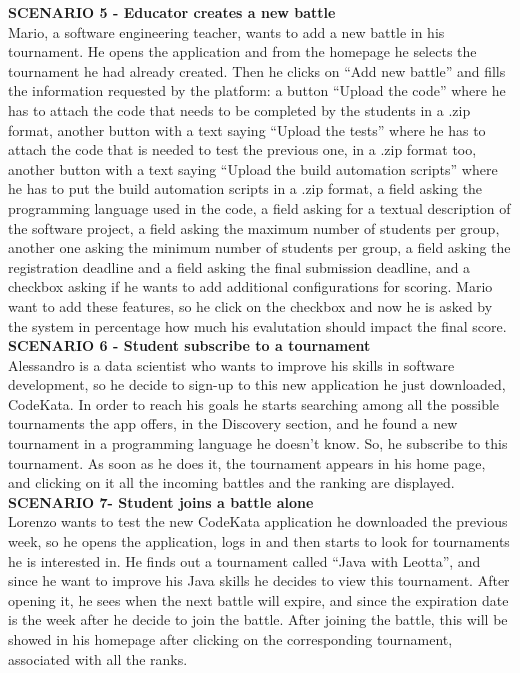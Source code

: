     \textbf{SCENARIO 5 - Educator creates a new battle}\\
    Mario, a software engineering teacher, wants to add a new battle in his tournament. He opens the application and from the homepage he selects the tournament he had already created. Then he clicks on ``Add new battle'' and fills the information requested by the platform:
    a button ``Upload the code'' where he has to attach the code that needs to be completed by the students in a .zip format, another button with a text saying  ``Upload the tests'' where he has to attach the code that is needed to test the previous one, in a .zip format too, another button with a text saying  ``Upload the build automation scripts'' where he has to put the build automation scripts in a .zip format, a field asking the programming language used in the code, a field asking for a textual description of the software project, a field asking the maximum number of students per group, another one asking the minimum number of students per group, a field asking the registration deadline and a field asking the final submission deadline, and a checkbox asking if he wants to add additional configurations for scoring.
    Mario want to add these features, so he click on the checkbox and now he is asked by the system in percentage how much his evalutation should impact the final score.\\


    \textbf{SCENARIO 6 - Student subscribe to a tournament}\\
    Alessandro is a data scientist who wants to improve his skills in software development, so he decide to sign-up to this new application he just downloaded, CodeKata. 
    In order to reach his goals he starts searching among all the possible tournaments the app offers, in the Discovery section, and he found a new tournament in a programming language he doesn't know. So, he subscribe to this tournament. 
    As soon as he does it, the tournament appears in his home page, and clicking on it all the incoming battles and the ranking are displayed.\\


    \textbf{SCENARIO 7- Student joins a battle alone}\\
    Lorenzo wants to test the new CodeKata application he downloaded the previous week, so he opens the application, logs in and then starts to look for tournaments he is interested in. He finds out a tournament called ``Java with Leotta'', and since he want to improve his Java skills he decides to view this tournament.
    After opening it, he sees when the next battle will expire, and since the expiration date is the week after he decide to join the battle. 
    After joining the battle, this will be showed in his homepage after clicking on the corresponding tournament, associated with all the ranks. \\


